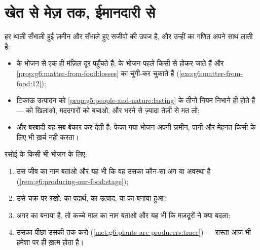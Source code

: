 \section{खेत से मेज़ तक, ईमानदारी से}

\begin{proposition}[मेज़ पर चढ़े दाम]\label{prop:g6:producing-our-food:costs}
हर थाली सँभाली हुई ज़मीन और सँभाले हुए सजीवों की उपज है, और उन्हीं का
गणित अपने साथ लाती है:
\begin{itemize}
  \item {} के भोजन  से एक ही मंज़िल दूर पहुँचते हैं;  के
        भोजन पहले किसी  से होकर जाते हैं और
        \cref{prop:g6:matter-from-food:losses} का चुंगी-कर चुकाते हैं
        (\cref{exo:g6:matter-from-food:12});
  \item टिकाऊ उत्पादन को \cref{prop:g5:people-and-nature:lasting} के
        तीनों नियम निभाने ही होते हैं ---  को खिलाओ, मददगारों को
        बचाओ, और भरने से ज़्यादा तेज़ी से मत लो;
  \item और बरबादी यह सब बेकार कर देती है: फेंका गया भोजन अपनी ज़मीन,
        पानी और मेहनत किसी के लिए भी ख़र्च नहीं करता।
\end{itemize}
\end{proposition}
\admitted

\begin{method}[किसी भोजन की कहानी पढ़ना]\label{met:g6:producing-our-food:read}
रसोई के किसी भी भोजन के लिए:
\begin{enumerate}
  \item उस जीव का नाम बताओ और यह भी कि वह उसका कौन-सा अंग या अवस्था है
        (\cref{rem:g6:producing-our-food:stage});
  \item उसे चक्र पर रखो:  का पदार्थ,  का उत्पाद, या
         का बनाया हुआ?
  \item अगर  का बनाया है, तो कच्चे माल का नाम बताओ और यह
        भी कि मज़दूरों ने क्या बदला;
  \item उसका पीछा उसकी  तक करो
        (\cref{met:g6:plants-are-producers:trace}) --- रास्ता आज भी
        हमेशा  पर ही ख़त्म होता है।
\end{enumerate}
\end{method}

